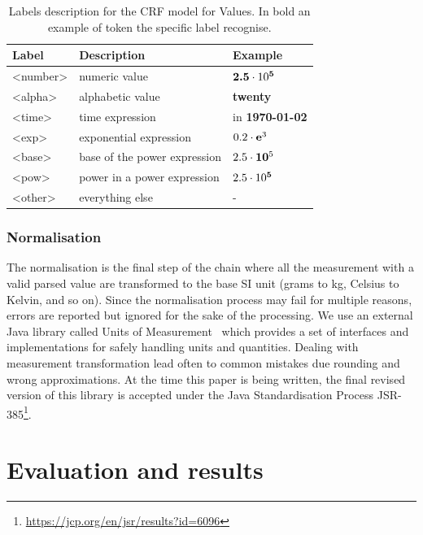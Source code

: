 \documentclass[sigplan, anonymous, review]{acmart}
\begin{document}
\begin{table}[ht]
  \caption{Labels description for the CRF model for Values. In bold an example of token the specific label recognise.}
  \label{tab:values-model-labels}
  \begin{tabular}{lll}
    \toprule
    Label & Description & Example\\
    \midrule
    <number> & numeric value & $\textbf{2.5}\cdot10\textsuperscript{\textbf{5}}$ \\
    <alpha> & alphabetic value & \textbf{twenty} \\
    <time> & time expression  & in \textbf{1970-01-02}\\
    <exp> & exponential expression & $0.2\cdot\textbf{e}\textsuperscript{3}$ \\
    <base> & base of the power expression & $2.5\cdot\textbf{10}\textsuperscript{5}$\\
    <pow> & power in a power expression & $2.5\cdot10\textsuperscript{\textbf{5}}$ \\
    <other> & everything else & - \\
  \bottomrule
\end{tabular}
\end{table}

\subsubsection{Normalisation}

The normalisation is the final step of the chain where all the measurement with a valid parsed value are transformed to the base SI unit (grams to kg, Celsius to Kelvin, and so on). Since the normalisation process may fail for multiple reasons, errors are reported but ignored for the sake of the processing. We use an external Java library called Units of Measurement~\cite{units_of_measurement} which provides a set of interfaces and implementations for safely handling units and quantities. Dealing with measurement transformation lead often to common mistakes due rounding and wrong approximations. At the time this paper is being written, the final revised version of this library is accepted under the Java Standardisation Process JSR-385\footnote{\url{https://jcp.org/en/jsr/results?id=6096}}. 

\section{Evaluation and results}
\label{sec:results}
\end{document}
